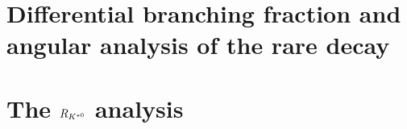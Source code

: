 \documentclass[a4paper,twoside,12pt]{report}
\begin{document}


\tableofcontents
\clearpage\null\newpage



%

{}
\linenumbers %







\cleardoublepage
\part{Differential branching fraction and angular analysis of the rare \Lb\to\Lz\mumu decay}
\label{par:Lmumu}
\cleardoublepage





%






\cleardoublepage
\part{The $R_{K^{*0}}$ analysis}
\cleardoublepage
\label{par:RKst}











\cleardoublepage
\renewcommand{\bibname}{REFERENCES}
%


\cleardoublepage

\appendix

%




\end{document}
